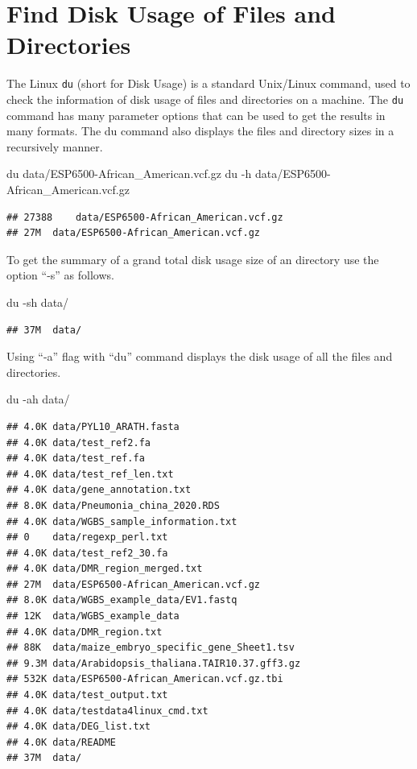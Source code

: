 \documentclass[]{book}
\makeatletter
\newenvironment{Shaded}{\begin{snugshade}}{\end{snugshade}}
\newcommand{\FunctionTok}[1]{\textcolor[rgb]{0.00,0.00,0.00}{#1}}
\newcommand{\NormalTok}[1]{#1}
\newenvironment{kframe}{%
\medskip{}
\setlength{\fboxsep}{.8em}
 \def\at@end@of@kframe{}%
 \ifinner\ifhmode%
  \def\at@end@of@kframe{\end{minipage}}%
  \begin{minipage}{\columnwidth}%
 \fi\fi%
 \def\FrameCommand##1{\hskip\@totalleftmargin \hskip-\fboxsep
 \colorbox{shadecolor}{##1}\hskip-\fboxsep
     \hskip-\linewidth \hskip-\@totalleftmargin \hskip\columnwidth}%
 \MakeFramed {\advance\hsize-\width
   \@totalleftmargin\z@ \linewidth\hsize
   \@setminipage}}%
 {\par\unskip\endMakeFramed%
 \at@end@of@kframe}
\renewenvironment{Shaded}{\begin{kframe}}{\end{kframe}}
\makeatother
\begin{document}
\hypertarget{find-disk-usage-of-files-and-directories}{%
\section{Find Disk Usage of Files and Directories}\label{find-disk-usage-of-files-and-directories}}

The Linux \texttt{du} (short for Disk Usage) is a standard Unix/Linux command, used to check the information of disk usage of files and directories on a machine. The \texttt{du} command has many parameter options that can be used to get the results in many formats. The du command also displays the files and directory sizes in a recursively manner.

\begin{Shaded}
\begin{Highlighting}[]
\FunctionTok{du}\NormalTok{ data/ESP6500-African_American.vcf.gz}
\FunctionTok{du}\NormalTok{ -h data/ESP6500-African_American.vcf.gz}
\end{Highlighting}
\end{Shaded}

\begin{verbatim}
## 27388    data/ESP6500-African_American.vcf.gz
## 27M  data/ESP6500-African_American.vcf.gz
\end{verbatim}

To get the summary of a grand total disk usage size of an directory use the option ``-s'' as follows.

\begin{Shaded}
\begin{Highlighting}[]
\FunctionTok{du}\NormalTok{ -sh data/}
\end{Highlighting}
\end{Shaded}

\begin{verbatim}
## 37M  data/
\end{verbatim}

Using ``-a'' flag with ``du'' command displays the disk usage of all the files and directories.

\begin{Shaded}
\begin{Highlighting}[]
\FunctionTok{du}\NormalTok{ -ah data/}
\end{Highlighting}
\end{Shaded}

\begin{verbatim}
## 4.0K data/PYL10_ARATH.fasta
## 4.0K data/test_ref2.fa
## 4.0K data/test_ref.fa
## 4.0K data/test_ref_len.txt
## 4.0K data/gene_annotation.txt
## 8.0K data/Pneumonia_china_2020.RDS
## 4.0K data/WGBS_sample_information.txt
## 0    data/regexp_perl.txt
## 4.0K data/test_ref2_30.fa
## 4.0K data/DMR_region_merged.txt
## 27M  data/ESP6500-African_American.vcf.gz
## 8.0K data/WGBS_example_data/EV1.fastq
## 12K  data/WGBS_example_data
## 4.0K data/DMR_region.txt
## 88K  data/maize_embryo_specific_gene_Sheet1.tsv
## 9.3M data/Arabidopsis_thaliana.TAIR10.37.gff3.gz
## 532K data/ESP6500-African_American.vcf.gz.tbi
## 4.0K data/test_output.txt
## 4.0K data/testdata4linux_cmd.txt
## 4.0K data/DEG_list.txt
## 4.0K data/README
## 37M  data/
\end{verbatim}
\end{document}
